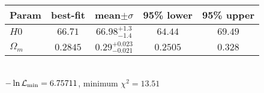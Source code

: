 \begin{tabular}{|l|c|c|c|c|} 
 \hline 
Param & best-fit & mean$\pm\sigma$ & 95\% lower & 95\% upper \\ \hline 
$H0$ &$66.71$ & $66.98_{-1.4}^{+1.3}$ & $64.44$ & $69.49$ \\ 
$\Omega_{m }$ &$0.2845$ & $0.29_{-0.021}^{+0.023}$ & $0.2505$ & $0.328$ \\ 
\hline 
 \end{tabular} \\ 
$-\ln{\cal L}_\mathrm{min} =6.75711$, minimum $\chi^2=13.51$ \\ 
